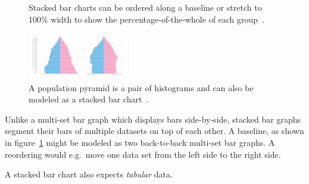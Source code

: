 \begin{figure}
  \centering
  \qquad
  \caption{Stacked bar charts can be ordered along a baseline or stretch to 100\% width to show the percentage-of-the-whole of each group~\parencite{VisualizationCatalogue2017}.}%
  \label{fig:analysis:stacked-bar-chart}
\end{figure}

\begin{figure}
  \centering
  \includegraphics[width=0.4\textwidth]{figures/analysis/population-pyramid.png}%
  \caption{A population pyramid is a pair of histograms and can also be modeled as a stacked bar chart~\parencite{VisualizationCatalogue2017}.}%
  \label{fig:analysis:population-pyramid}
\end{figure}

Unlike a multi-set bar graph which displays bars side-by-side, stacked bar graphs segment their bars of multiple datasets on top of each other.
A baseline, as shown in figure~\ref{fig:analysis:stacked-bar-chart} might be modeled as two back-to-back multi-set bar graphs. A reordering would e.g.\ move one data set from the left side to the right side.

A stacked bar chart also expects \emph{tabular} data.

